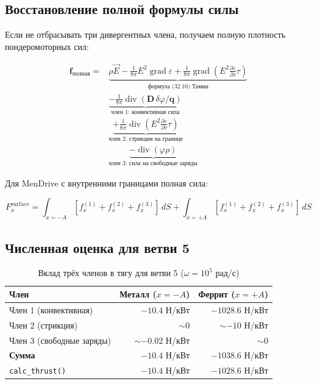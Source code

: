 \documentclass[a4paper,12pt]{article}
\begin{document}
\subsection{Восстановление полной формулы силы}

Если не отбрасывать три дивергентных члена, получаем полную плотность
пондеромоторных сил:

\begin{equation}
\boxed{
\begin{aligned}
\mathbf{f}_{\text{полная}} = &\underbrace{\rho\vec{E} - \frac{1}{8\pi}E^2\operatorname{grad}\varepsilon + \frac{1}{8\pi}\operatorname{grad}\!\left(E^2\frac{\partial\varepsilon}{\partial\tau}\tau\right)}_{\text{формула (32.10) Тамма}} \\
&\underbrace{- \frac{1}{8\pi}\operatorname{div}(\mathbf{D}\,\delta\varphi/\mathbf{q})}_{\text{член 1: конвективная сила}} \\
&\underbrace{+ \frac{1}{8\pi}\operatorname{div}\!\left(E^2\frac{\partial\varepsilon}{\partial\tau}\tau\right)}_{\text{член 2: стрикция на границе}} \\
&\underbrace{- \operatorname{div}(\varphi\rho)}_{\text{член 3: сила на свободные заряды}}
\end{aligned}
}
\label{eq:full_force_density}
\end{equation}

Для MenDrive с внутренними границами полная сила:

\begin{equation}
\boxed{
F_x^{\text{surface}} = \int_{x=-A}[f_x^{(1)} + f_x^{(2)} + f_x^{(3)}]\,dS +
\int_{x=+A}[f_x^{(1)} + f_x^{(2)} + f_x^{(3)}]\,dS
}
\label{eq:full_surface_force}
\end{equation}

\subsection{Численная оценка для ветви 5}

\begin{table}[h]
\centering
\caption{Вклад трёх членов в тягу для ветви 5 ($\omega = 10^5$ рад/с)}
\label{tab:branch5_terms_contribution}
\begin{tabular}{@{}lrr@{}}
\toprule
\textbf{Член} & \textbf{Металл ($x=-A$)} & \textbf{Феррит ($x=+A$)} \\
\midrule
Член 1 (конвективная) & $-10.4$ Н/кВт & $\mathbf{-1028.6}$ Н/кВт \\
Член 2 (стрикция) & $\sim 0$ & $\sim -10$ Н/кВт \\
Член 3 (свободные заряды) & $\sim -0.02$ Н/кВт & $\sim 0$ \\
\midrule
\textbf{Сумма} & $\mathbf{-10.4}$ Н/кВт & $\mathbf{-1038.6}$ Н/кВт \\
\texttt{calc\_thrust()} & $-10.4$ Н/кВт & $-1028.6$ Н/кВт \\
\bottomrule
\end{tabular}
\end{table}
\end{document}
